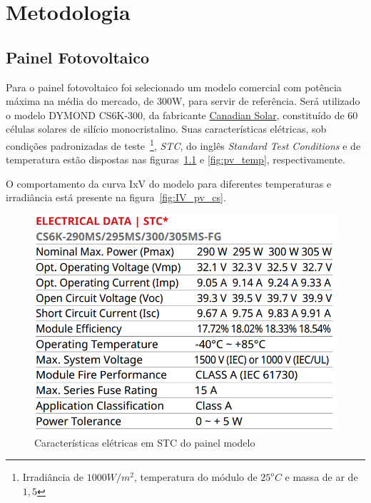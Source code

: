 \documentclass[
	12pt,				%
	openany,
	onseside,
	a4paper,			%
	english,			%
	french,				%
	spanish,			%
	brazil,				%
	]{abntex2}
\begin{document}




\chapter{Metodologia}

\section{Painel Fotovoltaico}

Para o painel fotovoltaico foi selecionado um modelo comercial com potência máxima na média do mercado, de 300W, para servir de referência. Será utilizado o modelo DYMOND CS6K-300, da fabricante \href{https://www.canadiansolar.com/en}{Canadian Solar}, constituído de 60 células solares de silício monocristalino. Suas características elétricas, sob condições padronizadas de teste~\footnote{Irradiância de $1000W/m^2$, temperatura do módulo de $25^oC$ e massa de ar de $1,5$}, \emph{STC}, do inglês \textit{Standard Test Conditions} e de temperatura estão dispostas nas figuras~\ref{fig:pv_elet} e \ref{fig:pv_temp}, respectivamente.

O comportamento da curva IxV do modelo para diferentes temperaturas e irradiância está presente na figura~\ref{fig:IV_pv_cs}. 
\begin{figure}[htbp]%
	\begin{center}%
		\includegraphics[width=0.55 \linewidth]{elet_canadian_300}
		\caption{Características elétricas em STC do painel modelo \cite{Canadian_Datasheet}}
		\label{fig:pv_elet}
	\end{center}
\end{figure}
\end{document}
